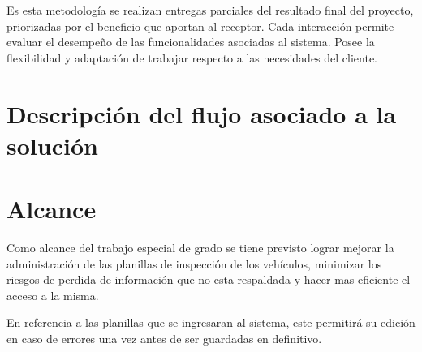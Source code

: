 Es esta metodología se realizan entregas parciales del resultado final del proyecto, priorizadas por el beneficio que aportan al receptor. Cada interacción permite evaluar el desempeño de las funcionalidades asociadas al sistema. Posee la flexibilidad y adaptación de trabajar respecto a las necesidades del cliente. 

\setlength{\parskip}{0mm}

\section{Descripción del flujo asociado a la solución}


\section{Alcance}

Como alcance del trabajo especial de grado se tiene previsto lograr mejorar la administración de las planillas de inspección de los vehículos, minimizar los riesgos de perdida de información que no esta respaldada y hacer mas eficiente el acceso a la misma.

En referencia a las planillas que se ingresaran al sistema, este permitirá su edición en caso de errores una vez antes de ser guardadas en definitivo.
